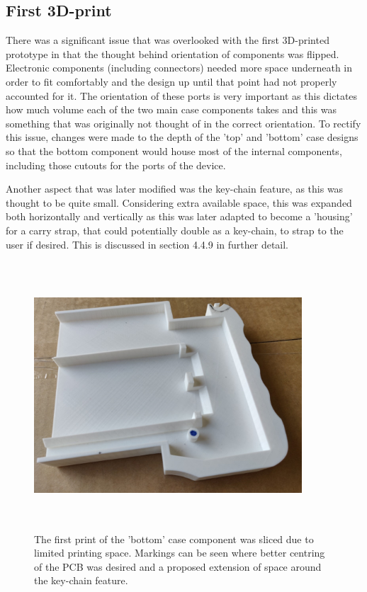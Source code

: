 \subsection{First 3D-print}

There was a significant issue that was overlooked with the first 3D-printed prototype in that the thought behind orientation of components was flipped.
Electronic components (including connectors) needed more space underneath in order to fit comfortably and the design up until that point had not properly accounted for it.
The orientation of these ports is very important as this dictates how much volume each of the two main case components takes and this was something that was originally not thought of in the correct orientation.
To rectify this issue, changes were made to the depth of the 'top' and 'bottom' case designs so that the bottom component would house most of the internal components, including those cutouts for the ports of the device.

Another aspect that was later modified was the key-chain feature, as this was thought to be quite small.
Considering extra available space, this was expanded both horizontally and vertically as this was later adapted to become a 'housing' for a carry strap, that could potentially double as a key-chain, to strap to the user if desired.
This is discussed in section 4.4.9 in further detail.

\begin{figure} [h]
    \centering
    \includegraphics[width=10cm,height=10cm,keepaspectratio]{Figures/firstprint.png}
    \caption{The first print of the 'bottom' case component was sliced due to limited printing space. Markings can be seen where better centring of the PCB was desired and a proposed extension of space around the key-chain feature.}
    \label{fig:First}
\end{figure}

